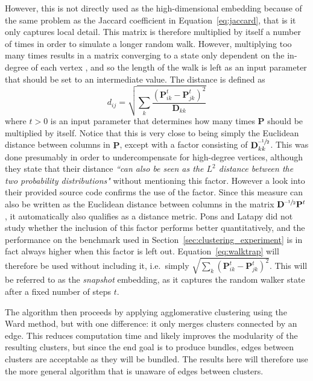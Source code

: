 However, this is not directly used as the high-dimensional embedding because of the same problem as the Jaccard coefficient in Equation~\eqref{eq:jaccard}, that is it only captures local detail. This matrix is therefore multiplied by itself a number of times in order to simulate a longer random walk. However, multiplying too many times results in a matrix converging to a state only dependent on the in-degree of each vertex \cite{Pons2006}, and so the length of the walk is left as an input parameter that should be set to an intermediate value.
The distance is defined as
\begin{equation}
  d_{ij} = \sqrt{\sum_{k}\frac{(\mathbf{P}_{ik}^t - \mathbf{P}_{jk}^t)^2}{\mathbf{D}_{kk}}}
  \label{eq:walktrap}
\end{equation}
where $t>0$ is an input parameter that determines how many times $\mathbf{P}$ should be multiplied by itself.
Notice that this is very close to being simply the Euclidean distance between columns in $\mathbf{P}$, except with a factor consisting of $\mathbf{D}_{kk}^{\text{--}\sfrac{1}{2}}$. This was done presumably in order to undercompensate for high-degree vertices, although they state that their distance \textit{``can also be seen as the $L^2$ distance between the two probability distributions"} \cite{Pons2006} without mentioning this factor. However a look into their provided source code confirms the use of the factor.
Since this measure can also be written as the Euclidean distance between columns in the matrix $\mathbf{D}^{\text{--}\sfrac{1}{2}}\mathbf{P}^t$, it automatically also qualifies as a distance metric.
Pons and Latapy \cite{Pons2006} did not study whether the inclusion of this factor performs better quantitatively, and the performance on the benchmark used in Section~\ref{sec:clustering_experiment} is in fact always higher when this factor is left out. Equation~\eqref{eq:walktrap} will therefore be used without including it, i.e.\ simply $\sqrt{\sum_{k}(\mathbf{P}_{ik}^t - \mathbf{P}_{jk}^t)^2}$. This will be referred to as the \emph{snapshot} embedding, as it captures the random walker state after a fixed number of steps $t$.

The algorithm then proceeds by applying agglomerative clustering using the Ward method, but with one difference: it only merges clusters connected by an edge. This reduces computation time and likely improves the modularity of the resulting clusters, but since the end goal is to produce bundles, edges between clusters are acceptable as they will be bundled. The results here will therefore use the more general algorithm that is unaware of edges between clusters.


